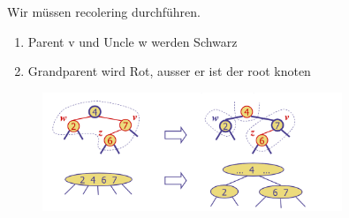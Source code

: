\documentclass[a4paper,10pt]{report}
\begin{document}
\begin{enumerate}
\begin{enumerate}
\begin{figure}[H]
\begin{center}
				\end{center}
			\end{figure}
			Wir müssen recolering durchführen.
			\begin{enumerate}
				\item
				Parent v und Uncle w werden Schwarz
				\item
				Grandparent wird Rot, ausser er ist der root knoten
			\end{enumerate}
			\begin{figure}[H]
				\begin{center}
  					\includegraphics[width=0.8\textwidth]{img/redblackrecoloring.png}
				\end{center}
			\end{figure}
		\end{enumerate}		
\end{enumerate}
\newpage
\end{document}
